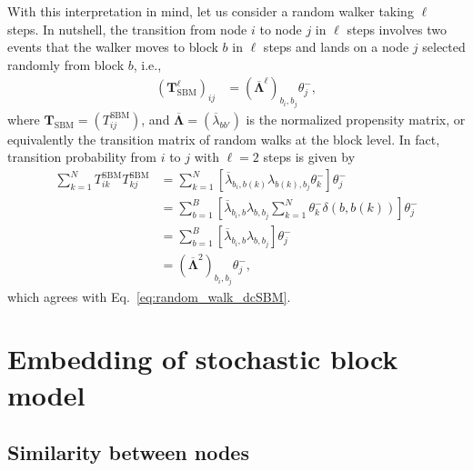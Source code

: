 \documentclass[12pt]{article} %
\def\ie{i.e.,~}
\def\mat#1{\mathbf{#1}}
\begin{document}
With this interpretation in mind, let us consider a random walker taking $\ell$ steps.
In nutshell, the transition from node $i$ to node $j$ in $\ell$ steps involves two events that the walker moves to block $b$ in $\ell$ steps and lands on a node $j$ selected randomly from block $b$, \ie
\begin{align}
    \label{eq:random_walk_dcSBM}
    \left(\mat{T}_{\text{SBM}} ^{\ell} \right)_{ij} &= \left(\mat{\overline \Lambda} ^{\ell}\right)_{b_i, b_j} \theta^{-}_j,
\end{align}
where $\mat{T}_{\text{SBM}} = (T_{ij} ^{\text{SBM}})$, and $\mat{\overline \Lambda} = (\overline\lambda_{bb'})$ is the normalized propensity matrix, or equivalently the transition matrix of random walks at the block level.
In fact, transition probability from $i$ to $j$ with $\ell=2$ steps is given by
\begin{align}
    \sum_{k=1}^N T^{\text{SBM}} _{ik} T^{\text{SBM}} _{kj} &= \sum_{k=1}^N \left[\overline \lambda_{b_i, b(k)} \lambda_{b(k), b_j} \theta^{-}_k \right] \theta^{-}_j \nonumber \\
                                                           &= \sum_{b=1}^B \left[\overline \lambda_{b_i, b} \lambda_{b, b_j} \sum_{k=1}^N \theta^{-}_{k} \delta(b, b(k))\right] \theta^{-}_j \nonumber \\
                                                           &= \sum_{b=1}^B \left[\overline \lambda_{b_i, b} \lambda_{b, b_j}\right] \theta^{-}_j \nonumber \\
                                                           &= \left(\mat{\overline \Lambda} ^{2}\right)_{b_i, b_j} \theta^{-}_j,
\end{align}
which agrees with Eq.~\eqref{eq:random_walk_dcSBM}.

\section{Embedding of stochastic block model}
\label{sec:community_embedding}

\subsection{Similarity between nodes}
\end{document}

